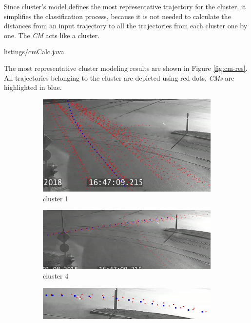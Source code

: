 Since cluster's model defines the most representative trajectory for the cluster, it simplifies the classification process, because it is not needed to calculate the distances from an input trajectory to all the trajectories from each cluster one by one. The \textit{CM} acts like a cluster.

 {listings/cmCalc.java}

The most representative cluster modeling results are shown in Figure \ref{fig:cm-res}. All trajectories belonging to the cluster are depicted using red dots, \textit{CMs} are highlighted in blue.

\begin{figure}[!htb]
	\centering
	\begin{subfigure}[!htb]{0.48\textwidth}
		\centering{}
		\includegraphics[width=\textwidth]{images/cm-1-from-8-0_95.png}
		\caption{cluster 1}
	\end{subfigure}
	\hfill
	\begin{subfigure}[!htb]{0.48\textwidth}
		\centering{}
		\includegraphics[width=\textwidth]{images/cm-4-from-8-0_95.png}
		\caption{cluster 4}
	\end{subfigure}
	\hfill
	\begin{subfigure}[!htb]{0.7\textwidth}
		\centering{}
		\includegraphics[width=\textwidth]{images/cm-3-from-8-0_95.png}

\end{subfigure}
\end{figure}
